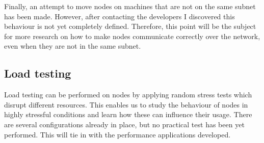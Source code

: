 \documentclass[12pt,twoside]{article}
\begin{document}
Finally, an attempt to move nodes on machines that are not on the same subnet has been made. However, after contacting the developers I discovered this behaviour is not yet completely defined. Therefore, this point will be the subject for more research on how to make nodes communicate correctly over the network, even when they are not in the same subnet.
\subsection{Load testing}
\label{sub:LoadTesting}
Load testing can be performed on nodes by applying random stress tests which disrupt different resources. This enables us to study the behaviour of nodes in highly stressful conditions and learn how these can influence their usage. There are several configurations already in place, but no practical test has been yet performed. This will tie in with the performance applications developed.
\newpage
\end{document}

